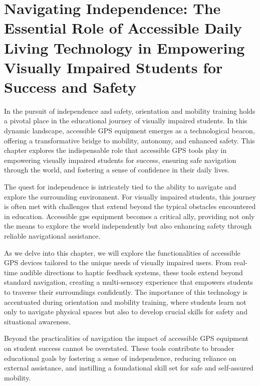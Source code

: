 \chapter{Navigating Independence: The Essential Role of Accessible Daily Living Technology in Empowering Visually Impaired Students for Success and Safety}\label{ch8:chap:accessible-daily-living}
\raggedright
In the pursuit of independence and safety, orientation and mobility training holds a pivotal place in the educational journey of visually impaired students. In this dynamic landscape, accessible GPS equipment emerges as a technological beacon, offering a transformative bridge to mobility, autonomy, and enhanced safety. This chapter explores the indispensable role that accessible GPS tools play in empowering visually impaired students for success, ensuring safe navigation through the world, and fostering a sense of confidence in their daily lives.

The quest for \gls{independence} is intricately tied to the ability to navigate and explore the surrounding environment. For visually impaired students, this journey is often met with challenges that extend beyond the typical obstacles encountered in education. Accessible \gls{gps} equipment becomes a critical ally, providing not only the means to explore the world independently but also enhancing \gls{safety} through reliable navigational assistance.

As we delve into this chapter, we will explore the functionalities of accessible GPS devices tailored to the unique needs of visually impaired users. From real-time audible directions to haptic feedback systems, these tools extend beyond standard navigation, creating a multi-sensory experience that empowers students to traverse their surroundings confidently. The importance of this technology is accentuated during orientation and mobility training, where students learn not only to navigate physical spaces but also to develop crucial skills for safety and situational awareness.

Beyond the practicalities of navigation the impact of accessible GPS equipment on student success cannot be overstated. These tools contribute to broader educational goals by fostering a sense of independence, reducing reliance on external assistance, and instilling a foundational skill set for safe and self-assured mobility.

